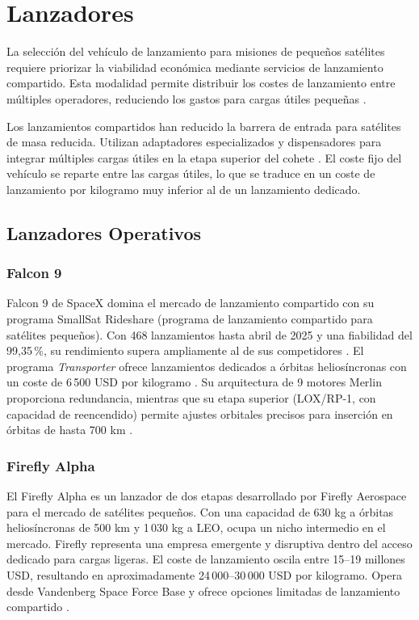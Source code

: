 \chapter{Lanzadores}
\minitoc

La selección del vehículo de lanzamiento para misiones de pequeños satélites requiere priorizar la viabilidad económica mediante servicios de lanzamiento compartido. Esta modalidad permite distribuir los costes de lanzamiento entre múltiples operadores, reduciendo los gastos para cargas útiles pequeñas \cite{spacex2022}.

Los lanzamientos compartidos han reducido la barrera de entrada para satélites de masa reducida. Utilizan adaptadores especializados y dispensadores para integrar múltiples cargas útiles en la etapa superior del cohete \cite{esa2024}. El coste fijo del vehículo se reparte entre las cargas útiles, lo que se traduce en un coste de lanzamiento por kilogramo muy inferior al de un lanzamiento dedicado.

\section{Lanzadores Operativos}

\subsection{Falcon 9}

Falcon 9 de SpaceX domina el mercado de lanzamiento compartido con su programa SmallSat Rideshare (programa de lanzamiento compartido para satélites pequeños). Con 468 lanzamientos hasta abril de 2025 y una fiabilidad del 99{,}35\,\%, su rendimiento supera ampliamente al de sus competidores \cite{satellitetoday2024}. El programa \textit{Transporter} ofrece lanzamientos dedicados a órbitas heliosíncronas con un coste de 6\,500 USD por kilogramo \cite{spacex2022, payloadspace2023}. Su arquitectura de 9 motores Merlin proporciona redundancia, mientras que su etapa superior (LOX/RP-1, con capacidad de reencendido) permite ajustes orbitales precisos para inserción en órbitas de hasta 700 km \cite{wikipedia2024}.

\subsection{Firefly Alpha}

El Firefly Alpha es un lanzador de dos etapas desarrollado por Firefly Aerospace para el mercado de satélites pequeños. Con una capacidad de 630 kg a órbitas heliosíncronas de 500 km y 1\,030 kg a LEO, ocupa un nicho intermedio en el mercado. Firefly representa una empresa emergente y disruptiva dentro del acceso dedicado para cargas ligeras. El coste de lanzamiento oscila entre 15--19 millones USD, resultando en aproximadamente 24\,000--30\,000 USD por kilogramo. Opera desde Vandenberg Space Force Base y ofrece opciones limitadas de lanzamiento compartido \cite{fireflyspace2024}.

